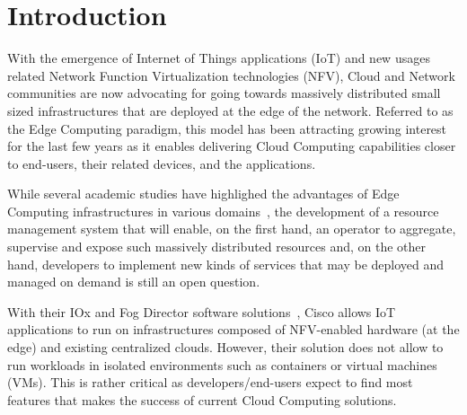 
\section{Introduction}
\label{sec:intro}


With the emergence of Internet of Things applications (IoT) and new
usages related Network Function
Virtualization technologies (NFV), Cloud and Network communities are now advocating
for going towards massively distributed small sized infrastructures
that are deployed at the edge of the network.
%
Referred to as the Edge Computing paradigm, this model has been attracting
growing interest for the last few years as it enables delivering Cloud
Computing capabilities closer to end-users, their related devices, and the applications.
%

While several academic studies have highlighed the advantages of Edge
Computing infrastructures in various
domains~\cite{bonomi2012fog,zhang2015cloud,yi2015fog,shi2016edge,satyanarayanan2017emergence},
the development of
a resource management system that will enable, on the first hand,
an operator to aggregate, supervise and expose such massively
distributed resources and, on the other hand, developers to implement
new kinds of services that may be deployed and managed on demand is
still an open question.

With their IOx and Fog Director software
solutions~\cite{bonomi2012fog}, Cisco allows IoT applications to run
on infrastructures composed of NFV-enabled hardware (at the edge) and
existing centralized clouds. However, their solution does not allow to
run workloads in isolated environments such as containers or virtual
machines (VMs). 
%
This is rather critical as developers/end-users expect to find
most features that makes the success of current Cloud Computing solutions.

